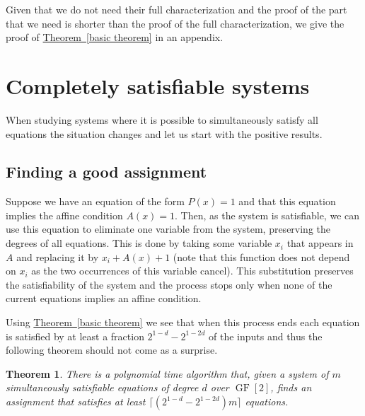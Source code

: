 \documentclass[10pt]{article}
\newtheorem{theorem}{Theorem}[section]
\theoremstyle{definition}
\numberwithin{equation}{section}
\newcommand{\expref}[2]{\texorpdfstring{\hyperref[#2]{#1~\ref{#2}}}{#1~\ref{#2}}}
\newcommand{\GF}{\operatorname{GF}}
\begin{document}
Given that we do not need their full characterization
and the proof of the part that we need is shorter
than the proof of the full characterization, we
give the proof of \expref{Theorem}{basic theorem} in
an appendix.
\setcounter{section}{3}
\section{Completely satisfiable systems}\label{sec: p}

When studying systems where it is possible
to simultaneously satisfy all equations
the situation changes and let us start with
the positive results.

\subsection{Finding a good assignment}

Suppose we have an
equation of the form
$P(x)=1$ and that
this equation implies the affine
condition $A(x)=1$.  Then,
as the system is satisfiable,
we can use this equation to eliminate
one variable from the system, preserving the
degrees of all equations.  This is done
by taking some variable $x_i$ that appears
in $A$ and replacing it by $x_i+A(x)+1$ (note that
this function does not depend on $x_i$ as the two
occurrences of this variable cancel).
This substitution preserves the satisfiability of the
system and the process stops only 
when none of the current equations implies an affine condition.

Using \expref{Theorem}{basic theorem} we see
that when this process ends each equation
is satisfied by at least a fraction
$2^{1-d}-2^{1-2d}$ of the inputs and thus the following
theorem should not come as a surprise.

\begin{theorem}\label{thm upper sat}
There is a polynomial time algorithm that,
given a system of $m$ simultaneously satisfiable equations
of degree $d$ over $\GF[2]$, finds an
assignment that satisfies at least
$\lceil (2^{1-d}-2^{1-2d})m\rceil$ equations.
\end{theorem}
\end{document}
